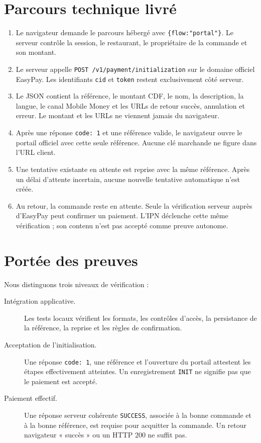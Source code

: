 \documentclass[11pt,a4paper]{article}
\begin{document}
\section{Parcours technique livré}
\begin{enumerate}
\item Le navigateur demande le parcours hébergé avec \texttt{\{flow:"portal"\}}. Le serveur contrôle la session, le restaurant, le propriétaire de la commande et son montant.
\item Le serveur appelle \texttt{POST /v1/payment/initialization} sur le domaine officiel EasyPay. Les identifiants \texttt{cid} et \texttt{token} restent exclusivement côté serveur.
\item Le JSON contient la référence, le montant CDF, le nom, la description, la langue, le canal Mobile Money et les URLs de retour succès, annulation et erreur. Le montant et les URLs ne viennent jamais du navigateur.
\item Après une réponse \texttt{code: 1} et une référence valide, le navigateur ouvre le portail officiel avec cette seule référence. Aucune clé marchande ne figure dans l'URL client.
\item Une tentative existante en attente est reprise avec la même référence. Après un délai d'attente incertain, aucune nouvelle tentative automatique n'est créée.
\item Au retour, la commande reste en attente. Seule la vérification serveur auprès d'EasyPay peut confirmer un paiement. L'IPN déclenche cette même vérification ; son contenu n'est pas accepté comme preuve autonome.
\end{enumerate}

\newpage
\section{Portée des preuves}
Nous distinguons trois niveaux de vérification :
\begin{description}
\item[Intégration applicative.] Les tests locaux vérifient les formats, les contrôles d'accès, la persistance de la référence, la reprise et les règles de confirmation.
\item[Acceptation de l'initialisation.] Une réponse \texttt{code: 1}, une référence et l'ouverture du portail attestent les étapes effectivement atteintes. Un enregistrement \texttt{INIT} ne signifie pas que le paiement est accepté.
\item[Paiement effectif.] Une réponse serveur cohérente \texttt{SUCCESS}, associée à la bonne commande et à la bonne référence, est requise pour acquitter la commande. Un retour navigateur « succès » ou un HTTP 200 ne suffit pas.
\end{description}
\end{document}
